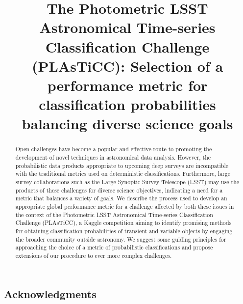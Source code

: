 \documentclass[\docopts]{\docclass}
\begin{document}
\linenumbers

\title{The Photometric LSST Astronomical Time-series Classification Challenge (PLAsTiCC): Selection of a performance metric for classification probabilities balancing diverse science goals}

\maketitlepre

\begin{abstract}

  Open challenges have become a popular and effective route to promoting the development of novel techniques in astronomical data analysis.
  However, the probabilistic data products appropriate to upcoming deep surveys are incompatible with the traditional metrics used on deterministic classifications.
  Furthermore, large survey collaborations such as the Large Synoptic Survey Telescope (LSST) may use the products of these challenges for diverse science objectives, indicating a need for a metric that balances a variety of goals.
  We describe the process used to develop an appropriate global performance metric for a challenge affected by both these issues in the context of the Photometric LSST Astronomical Time-series Classification Challenge (PLAsTiCC), a Kaggle competition aiming to identify promising methods for obtaining classification probabilities of transient and variable objects by engaging the broader community outside astronomy.
  We suggest some guiding principles for approaching the choice of a metric of probabilistic classifications and propose extensions of our procedure to ever more complex challenges.

\end{abstract}

\dockeys{}

\maketitlepost















\subsection*{Acknowledgments}
\end{document}
